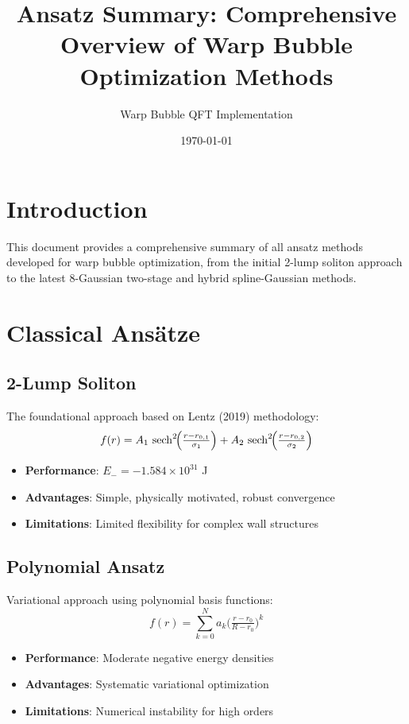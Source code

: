 \documentclass[12pt]{article}
\title{Ansatz Summary: Comprehensive Overview of Warp Bubble Optimization Methods}
\author{Warp Bubble QFT Implementation}
\date{\today}
\begin{document}
\maketitle

\section{Introduction}

This document provides a comprehensive summary of all ansatz methods developed for warp bubble optimization, from the initial 2-lump soliton approach to the latest 8-Gaussian two-stage and hybrid spline-Gaussian methods.

\section{Classical Ansätze}

\subsection{2-Lump Soliton}
The foundational approach based on Lentz (2019) methodology:
\[
  f(r) = A_1 \,\sech^2\!\Bigl(\tfrac{r - r_{0,1}}{\sigma_1}\Bigr) + A_2 \,\sech^2\!\Bigl(\tfrac{r - r_{0,2}}{\sigma_2}\Bigr)
\]

\begin{itemize}
\item \textbf{Performance}: $E_- = -1.584\times10^{31}$ J
\item \textbf{Advantages}: Simple, physically motivated, robust convergence
\item \textbf{Limitations}: Limited flexibility for complex wall structures
\end{itemize}

\subsection{Polynomial Ansatz}
Variational approach using polynomial basis functions:
\[
  f(r) = \sum_{k=0}^N a_k \bigl(\tfrac{r - r_0}{R - r_0}\bigr)^k
\]

\begin{itemize}
\item \textbf{Performance}: Moderate negative energy densities
\item \textbf{Advantages}: Systematic variational optimization
\item \textbf{Limitations}: Numerical instability for high orders
\end{itemize}
\end{document}
